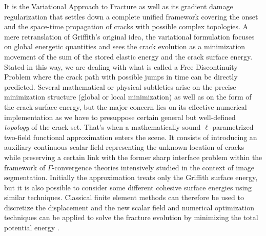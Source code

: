 It is the Variational Approach to Fracture as well as its gradient damage regularization \cite{BourdinFrancfortMarigo:2008} that settles down a complete unified framework covering the onset and the space-time propagation of cracks with possible complex topologies. A mere retranslation of Griffith's original idea, the variational formulation focuses on global energetic quantities and sees the crack evolution as a minimization movement of the sum of the stored elastic energy and the crack surface energy. Stated in this way, we are dealing with what is called a Free Discontinuity Problem where the crack path with possible jumps in time can be directly predicted. Several mathematical or physical subtleties arise on the precise minimization structure (global or local minimization) as well as on the form of the crack surface energy, but the major concern lies on its effective numerical implementation as we have to presuppose certain general but well-defined \emph{topology} of the crack set. That's when a mathematically sound $\ell$-parametrized two-field functional approximation \cite{BourdinFrancfortMarigo:2000} enters the scene. It consists of introducing an auxiliary continuous scalar field representing the unknown location of cracks while preserving a certain link with the former sharp interface problem within the framework of $\Gamma$-convergence theories intensively studied in the context of image segmentation. Initially the approximation treats only the Griffith surface energy, but it is also possible \cite{ContiFocardiIurlano:2015} to consider some different cohesive surface energies using similar techniques. Classical finite element methods can therefore be used to discretize the displacement and the new scalar field and numerical optimization techniques can be applied to solve the fracture evolution by minimizing the total potential energy \cite{PieroLancioniMarch:2007,MauriniBourdinGauthierLazarus:2013,HossainHsuehBourdinBhattachary:2014,MesgarnejadBourdinKhonsari:2014}.

